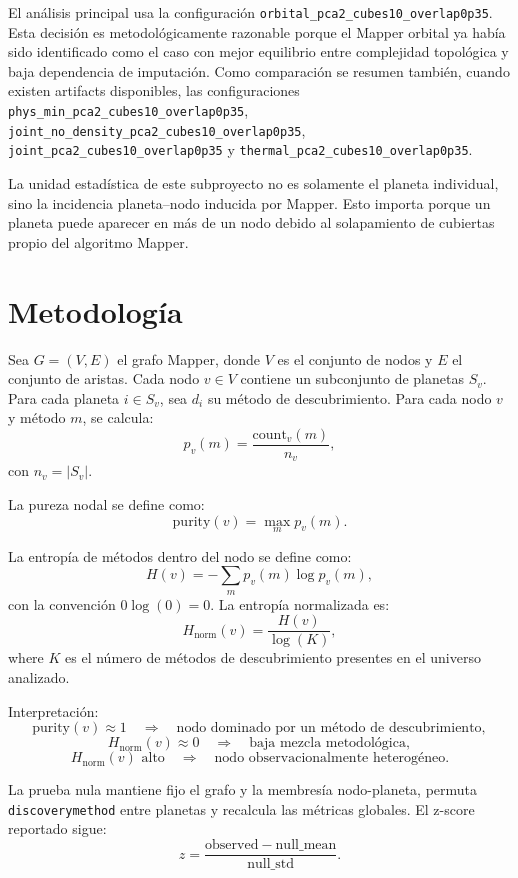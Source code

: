 \documentclass[11pt]{article}
\begin{document}
El análisis principal usa la configuración \texttt{orbital\_pca2\_cubes10\_overlap0p35}. Esta decisión es metodológicamente razonable porque el Mapper orbital ya había sido identificado como el caso con mejor equilibrio entre complejidad topológica y baja dependencia de imputación. Como comparación se resumen también, cuando existen artifacts disponibles, las configuraciones \texttt{phys\_min\_pca2\_cubes10\_overlap0p35}, \texttt{joint\_no\_density\_pca2\_cubes10\_overlap0p35}, \texttt{joint\_pca2\_cubes10\_overlap0p35} y \texttt{thermal\_pca2\_cubes10\_overlap0p35}.

La unidad estadística de este subproyecto no es solamente el planeta individual, sino la incidencia planeta--nodo inducida por Mapper. Esto importa porque un planeta puede aparecer en más de un nodo debido al solapamiento de cubiertas propio del algoritmo Mapper.

\section{Metodología}

Sea $G=(V,E)$ el grafo Mapper, donde $V$ es el conjunto de nodos y $E$ el conjunto de aristas. Cada nodo $v\in V$ contiene un subconjunto de planetas $S_v$. Para cada planeta $i\in S_v$, sea $d_i$ su método de descubrimiento. Para cada nodo $v$ y método $m$, se calcula:
\[
p_v(m) = \frac{\mathrm{count}_v(m)}{n_v},
\]
con $n_v=|S_v|$.

La pureza nodal se define como:
\[
\mathrm{purity}(v) = \max_m p_v(m).
\]

La entropía de métodos dentro del nodo se define como:
\[
H(v) = -\sum_m p_v(m)\log p_v(m),
\]
con la convención $0\log(0)=0$. La entropía normalizada es:
\[
H_{\mathrm{norm}}(v) = \frac{H(v)}{\log(K)},
\]
where $K$ es el número de métodos de descubrimiento presentes en el universo analizado.

Interpretación:
\[
\mathrm{purity}(v)\approx 1 \quad \Rightarrow \quad \text{nodo dominado por un método de descubrimiento},
\]
\[
H_{\mathrm{norm}}(v)\approx 0 \quad \Rightarrow \quad \text{baja mezcla metodológica},
\]
\[
H_{\mathrm{norm}}(v)\text{ alto} \quad \Rightarrow \quad \text{nodo observacionalmente heterogéneo}.
\]

La prueba nula mantiene fijo el grafo y la membresía nodo-planeta, permuta \texttt{discoverymethod} entre planetas y recalcula las métricas globales. El z-score reportado sigue:
\[
z = \frac{\mathrm{observed}-\mathrm{null\_mean}}{\mathrm{null\_std}}.
\]
\end{document}
